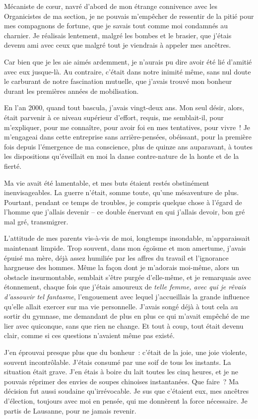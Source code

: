 \documentclass[
  extrafontsizes,
  oneside,
  14pt
]{memoir}
\begin{document}
Mécaniste de cœur, navré d'abord de mon étrange connivence avec les
Organicistes de ma section, je ne pouvais m'empêcher de ressentir de la pitié
pour mes compagnons de fortune, que je savais tout comme moi condamnés au
charnier. Je réalisais lentement, malgré les bombes et le brasier, que j'étais
devenu ami avec ceux que malgré tout je viendrais à appeler mes ancêtres.

Car bien que je les aie aimés ardemment, je n'aurais pu dire avoir été lié
d'amitié avec eux jusque-là. Au contraire, c'était dans notre inimité même,
sans nul doute le carburant de notre fascination mutuelle, que j'avais trouvé
mon bonheur durant les premières années de mobilisation.

En l'an 2000, quand tout bascula, j'avais vingt-deux ans. Mon seul désir,
alors, était parvenir à ce niveau supérieur d'effort, requis, me semblait-il,
pour m'expliquer, pour me connaître, pour avoir foi en mes tentatives, pour
vivre~! Je m'engageai dans cette entreprise sans arrière-pensées, obéissant,
pour la première fois depuis l'émergence de ma conscience, plus de quinze ans
auparavant, à toutes les dispositions qu'éveillait en moi la danse
contre-nature de la honte et de la fierté.

Ma vie avait été lamentable, et mes buts étaient restés obstinément
inenvisageables. La guerre n'était, somme toute, qu'une mésaventure de plus.
Pourtant, pendant ce temps de troubles, je compris quelque chose à l'égard de
l'homme que j'allais devenir -- ce double énervant en qui j'allais devoir, bon
gré mal gré, transmigrer.

L'attitude de mes parents vis-à-vis de moi, longtemps insondable,
m'apparaissait maintenant limpide. Trop souvent, dans mon égoïsme et mon
amertume, j'avais épuisé ma mère, déjà assez humiliée par les affres du
travail et l'ignorance hargneuse des hommes. Même la façon dont je
m'adorais moi-même, alors un obstacle insurmontable, semblait s'être
purgée d'elle-même, et je remarquais avec étonnement, chaque fois que
j'étais amoureux de \emph{telle femme, avec qui je rêvais d'assouvir tel
fantasme}, l'engouement avec lequel j'accueillais la grande influence
qu'elle allait exercer sur ma vie personnelle. J'avais songé déjà à tout
cela au sortir du gymnase, me demandant de plus en plus ce qui m'avait
empêché de me lier avec quiconque, sans que rien ne change. Et tout à
coup, tout était devenu clair, comme si ces questions n'avaient même pas
existé.

J'en éprouvai presque plus que du bonheur~: c'était de la joie, une joie
violente, souvent incontrôlable. J'étais consumé par une soif de tous les
instants. La situation était grave. J'en étais à boire du lait toutes les cinq
heures, et je ne pouvais réprimer des envies de soupes chinoises instantanées.
Que faire~? Ma décision fut aussi soudaine qu'irrévocable. Je sus que c'étaient
eux, mes ancêtres d'élection, toujours avec moi en pensée, qui me donnèrent la
force nécessaire. Je partis de Lausanne, pour ne jamais revenir.
\end{document}
